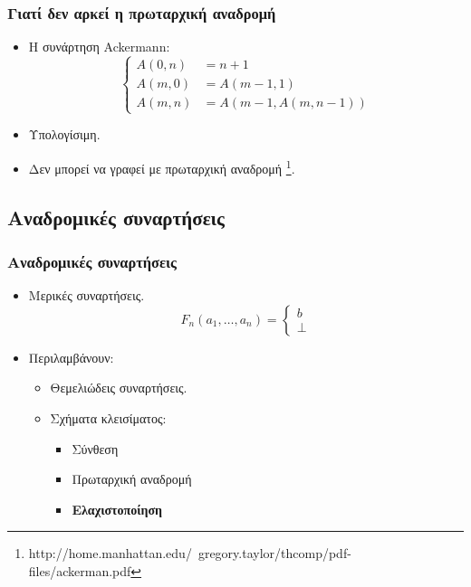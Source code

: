 \documentclass{beamer}
\begin{document}
\begin{frame}
        \frametitle{Γιατί δεν αρκεί η πρωταρχική αναδρομή}
        \begin{itemize}
                \item Η συνάρτηση Ackermann:
                $$\left\{
                    \begin{array}{ll}
                      A(0,n) &= n+1\\
                      A(m,0) &= A(m-1,1)\\
                      A(m,n) &= A(m-1, A(m,n-1))
                    \end{array}
                \right.$$
                \pause
                \item Υπολογίσιμη.
                \pause
                \item Δεν μπορεί να γραφεί με πρωταρχική αναδρομή 
                \footnote{
                {http://home.manhattan.edu/~gregory.taylor/thcomp/pdf-files/ackerman.pdf}}.
        \end{itemize}
\end{frame}

\subsection{Αναδρομικές συναρτήσεις}

\begin{frame}
        \frametitle{Αναδρομικές συναρτήσεις}
        \begin{itemize}
                \item Μερικές συναρτήσεις.
                $$F_n(a_1,\ldots,a_n)=
                  \left\{
                    \begin{array}{l}
                      b\\
                      \bot
                    \end{array}
                  \right.
                $$
                \pause 
                \item Περιλαμβάνουν:
                \begin{itemize}
                        \item Θεμελιώδεις συναρτήσεις.
                        \pause
                        \item Σχήματα κλεισίματος:
                        \begin{itemize}
                                \item Σύνθεση
                                \item Πρωταρχική αναδρομή
                                \pause
                                \item \textbf{Ελαχιστοποίηση}
                        \end{itemize}
                \end{itemize}
        \end{itemize}
\end{frame}
\end{document}
